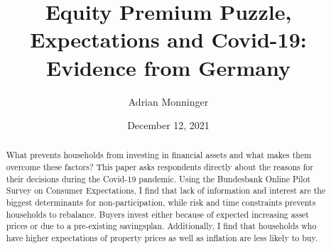 \documentclass[ProjectABM]{subfiles}
\begin{document}
\providecommand{\versn}{pdf} %
\ifthenelse{\boolean{Web}}{    %
  \renewcommand{\versn}{Web}     %
  \renewcommand{\rootFromOut}{.} %
}{}  %


\title{Equity Premium Puzzle, Expectations and Covid-19:\\ Evidence from Germany}

\author{Adrian Monninger\authNum}




\renewcommand{\forcedate}{December 12, 2021}\date{\forcedate}

\maketitle
\hypertarget{abstract}{}
\begin{abstract}
What prevents households from investing in financial assets and what makes them overcome these factors? This paper asks respondents directly about the reasons for their decisions during the Covid-19 pandemic. Using the Bundesbank Online Pilot Survey on Consumer Expectations, I find that lack of information and interest are the biggest determinants for non-participation, while risk and time constraints prevents households to rebalance. Buyers invest either because of expected increasing asset prices or due to a pre-existing savingsplan. Additionally, I find that households who have higher expectations of property prices as well as inflation are less likely to buy.
\end{abstract}


\hypertarget{links}{}

\begin{authorsinfo}
\end{authorsinfo}
\end{document}
